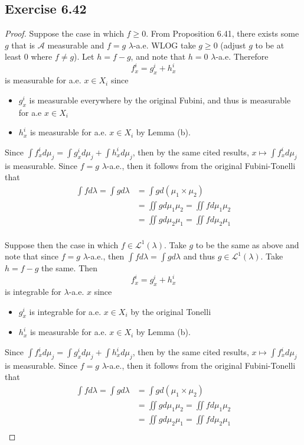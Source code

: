 \documentclass[hw_all.tex]{subfiles}
\begin{document}
\subsection{Exercise 6.42}

\begin{proof}
    Suppose the case in which $f \geq 0$. From Proposition 6.41, there exists some $g$ that is $\mathcal{A}$ measurable and $f = g$ $\lambda$-a.e. WLOG take $g \geq 0$ (adjust $g$ to be at least $0$ where $f\neq g$). Let $h = f - g$, and note that $h = 0$ $\lambda$-a.e. Therefore
    \[
        f_x^i = g_x^i + h_x^i
    \]
    is measurable for a.e. $x \in X_i$ since 
    \begin{itemize}
        \item $g_x^i$ is measurable everywhere by the original Fubini, and thus is measurable for a.e $x \in X_i$
        \item $h_x^i$ is measurable for a.e. $x \in X_i$ by Lemma (b). 
    \end{itemize}
    Since $\int f_x^i d \mu_j = \int g_x^i d \mu_j + \int h_x^i d \mu_j$, then by the same cited results, $x \mapsto \int f_x^i d \mu_j$ is measurable. Since $f = g$ $\lambda$-a.e., then it follows from the original Fubini-Tonelli that
    \begin{align*}
        \int f d \lambda = \int g d \lambda &= \int g d(\mu_1 \times \mu_2) \\
        &= \iint g d \mu_1 \mu_2 = \iint f d \mu_1 \mu_2 \\
        &= \iint g d \mu_2 \mu_1 = \iint f d \mu_2 \mu_1 \\
    \end{align*}

    Suppose then the case in which $f \in \mathcal{L}^1(\lambda)$. Take $g$ to be the same as above and note that since $f = g$ $\lambda$-a.e., then $\int f d \lambda = \int g d \lambda$ and thus $g \in \mathcal{L}^1(\lambda)$. Take $h = f - g$ the same. Then
    \[
        f_x^i = g_x^i + h_x^i
    \]
    is integrable for $\lambda$-a.e. $x$ since
    \begin{itemize}
        \item $g_x^i$ is integrable for a.e. $x \in X_i$ by the original Tonelli
        \item $h_x^i$ is measurable for a.e. $x \in X_i$ by Lemma (b). 
    \end{itemize}
    Since $\int f_x^i d \mu_j = \int g_x^i d \mu_j + \int h_x^i d \mu_j$, then by the same cited results, $x \mapsto \int f_x^i d \mu_j$ is measurable. Since $f = g$ $\lambda$-a.e., then it follows from the original Fubini-Tonelli that
    \begin{align*}
        \int f d \lambda = \int g d \lambda &= \int g d(\mu_1 \times \mu_2) \\
        &= \iint g d \mu_1 \mu_2 = \iint f d \mu_1 \mu_2 \\
        &= \iint g d \mu_2 \mu_1 = \iint f d \mu_2 \mu_1 \\
    \end{align*}

\end{proof}
\end{document}
